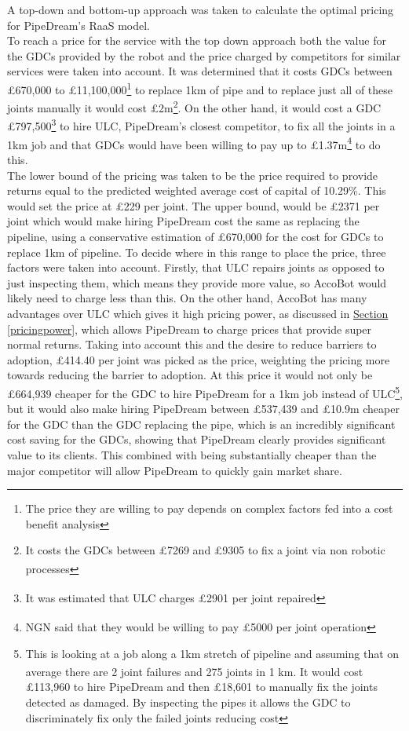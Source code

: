 \documentclass[11pt]{article}		%
\newcommand{\supercite}[1]{\textsuperscript{\cite{#1}}}		%
\newcommand{\sectref}[1]{\hyperref[#1]{Section \ref*{#1}}}     %
\begin{document}
                A top-down and bottom-up approach was taken to calculate the optimal pricing for PipeDream's RaaS model.
                 \\
            \hspace*{2ex}
                To reach a price for the service with the top down approach both the value for the GDCs provided by the robot and the price charged by competitors for similar services were taken into account. 
                It was determined that it costs GDCs between £670,000 to £11,100,000\footnote{The price they are willing to pay depends on complex factors fed into a cost benefit analysis} to replace 1km of pipe\supercite{SGN_Scotland} and to replace just all of these joints manually it would cost £2m\footnote{It costs the GDCs between £7269 and £9305 to fix a joint via non robotic processes\supercite{NYT}}.
	            On the other hand, it would cost a GDC £797,500\footnote{It was estimated that ULC charges £2901 per joint repaired\supercite{NYT}} to hire ULC\supercite{NYT}, PipeDream's closest competitor, to fix all the joints in a 1km job and that GDCs would have been willing to pay up to £1.37m\footnote{NGN said that they would be willing to pay £5000 per joint operation\supercite{NGN}} to do this.
	            \\
            \hspace*{2ex}
                The lower bound of the pricing was taken to be the price required to provide returns equal to the predicted weighted average cost of capital of 10.29\%.  This would set the price at £229 per joint. The upper bound, would be £2371 per joint which would make hiring PipeDream cost the same as replacing the pipeline, using a conservative estimation of £670,000 for the cost for GDCs to replace 1km of pipeline. To decide where in this range to place the price, three factors were taken into account. Firstly, that ULC repairs joints as opposed to just inspecting them, which means they provide more value, so AccoBot would likely need to charge less than this. On the other hand, AccoBot has many advantages over ULC which gives it high pricing power, as discussed in \sectref{pricingpower}, which allows PipeDream to charge prices that provide super normal returns. Taking into account this and the desire to reduce barriers to adoption, £414.40 per joint was picked as the price, weighting the pricing more towards reducing the barrier to adoption. At this price it would not only be £664,939 cheaper for the GDC to hire PipeDream for a 1km job instead of ULC\footnote{This is looking at a job along a 1km stretch of pipeline and assuming that on average there are 2 joint failures and 275 joints in 1 km\supercite{SGN_Southern}. It would cost £113,960 to hire PipeDream and then £18,601 to manually fix the joints detected as damaged. By inspecting the pipes it allows the GDC to discriminately fix only the failed joints reducing cost}, but it would also make hiring PipeDream between £537,439 and £10.9m cheaper for the GDC than the GDC  replacing the pipe, which is an incredibly significant cost saving for the GDCs, showing that PipeDream clearly provides significant value to its clients. This combined with being substantially cheaper than the major competitor will allow PipeDream to quickly gain market share.
\end{document}
